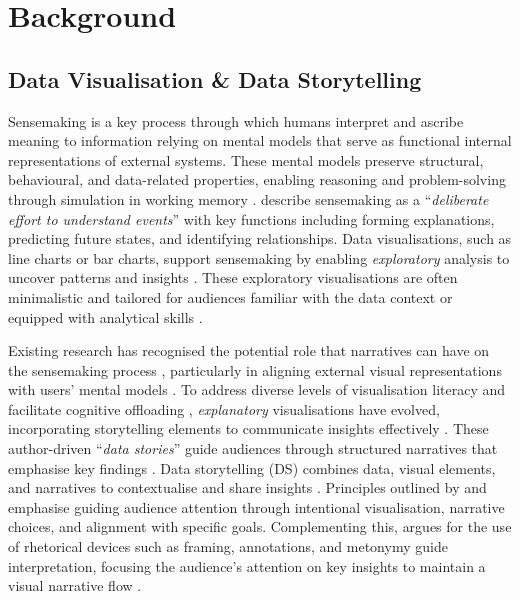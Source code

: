 \section{Background}
\subsection{Data Visualisation \& Data Storytelling}
Sensemaking is a key process through which humans interpret and ascribe meaning to information \cite{campos2021makingsense} relying on mental models that serve as functional internal representations of external systems. These mental models preserve structural, behavioural, and data-related properties, enabling reasoning and problem-solving through simulation in working memory \cite{liu2010mental}. \citet{klein2007data} describe sensemaking as a ``\textit{deliberate effort to understand events}'' with key functions including forming explanations, predicting future states, and identifying relationships. Data visualisations, such as line charts or bar charts, support sensemaking by enabling \textit{exploratory} analysis to uncover patterns and insights \cite{Zhang2020dataquilt, knaflic2015storytelling, evergreen2020effective}. These exploratory visualisations are often minimalistic and tailored for audiences familiar with the data context or equipped with analytical skills \cite{martinezmaldonado2020layeredstorytelling, srinivasan2019augmenting}.

Existing research has recognised the potential role that narratives can have on the sensemaking process \cite{figueiras2014narrative, pirolli2005sensemaking}, particularly in aligning external visual representations with users’ mental models \cite{liu2010mental}. To address diverse levels of visualisation literacy and facilitate cognitive offloading \cite{liu2010mental,hullman2011visualization}, \textit{explanatory} visualisations have evolved, incorporating storytelling elements to communicate insights effectively \cite{figueiras2014narrative}. These author-driven “\textit{data stories}” guide audiences through structured narratives that emphasise key findings \cite{segel2010narrative, hullman2011visualization, echeverria2018exploratory}. Data storytelling (DS) combines data, visual elements, and narratives to contextualise and share insights \cite{ryan2016visual, dykes2020effective}. Principles outlined by \citet{echeverria2018exploratory} and \citet{martinezmaldonado2020layeredstorytelling} emphasise guiding audience attention through intentional visualisation, narrative choices, and alignment with specific goals. Complementing this, \citet{hullman2011visualization} argues for the use of rhetorical devices such as framing, annotations, and metonymy guide interpretation, focusing the audience’s attention on key insights to maintain a visual narrative flow \cite{mckenna2017visual}.

